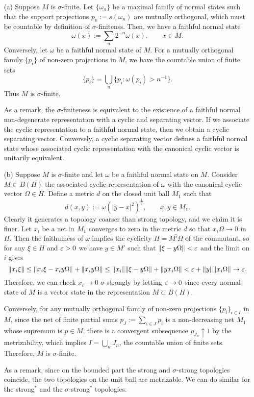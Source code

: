 \documentclass{../../large}
\begin{document}
\begin{pf}
(a)
Suppose $M$ is $\sigma$-finite.
Let $\{\omega_n\}$ be a maximal family of normal states such that the support projections $p_n:=s(\omega_n)$ are mutually orthogonal, which must be countable by definition of $\sigma$-finitenss.
Then, we have a faithful normal state
\[\omega(x):=\sum_n2^{-n}\omega(x),\qquad x\in M.\]
Conversely, let $\omega$ be a faithful normal state of $M$.
For a mutually orthogonal family $\{p_i\}$ of non-zero projections in $M$, we have the countable union of finite sets
\[\{p_i\}=\bigcup_n\{p_i:\omega(p_i)>n^{-1}\}.\]
Thus $M$ is $\sigma$-finite.

As a remark, the $\sigma$-finiteness is equivalent to the existence of a faithful normal non-degenerate representation with a cyclic and separating vector.
If we associate the cyclic representation to a faithful normal state, then we obtain a cyclic separating vector.
Conversely, a cyclic separating vector defines a faithful normal state whose associated cyclic representation with the canonical cyclic vector is unitarily equivalent.

(b)
Suppose $M$ is $\sigma$-finite and let $\omega$ be a faithful normal state on $M$.
Consider $M\subset B(H)$ the associated cyclic representation of $\omega$ with the canonical cyclic vector $\Omega\in H$.
Define a metric $d$ on the closed unit ball $M_1$ such that
\[d(x,y):=\omega(|y-x|^2)^{\frac12},\qquad x,y\in M_1.\]
Clearly it generates a topology coarser than strong topology, and we claim it is finer.
Let $x_i$ be a net in $M_1$ converges to zero in the metric $d$ so that $x_i\Omega\to0$ in $H$.
Then the faithulness of $\omega$ implies the cyclicity $H=\bar{M'\Omega}$ of the commutant, so for any $\xi\in H$ and $\varepsilon>0$ we have $y\in M'$ such that $\|\xi-y\Omega\|<\varepsilon$ and the limit on $i$ gives
\[\|x_i\xi\|\le\|x_i\xi-x_iy\Omega\|+\|x_iy\Omega\|\le\|x_i\|\|\xi-y\Omega\|+\|yx_i\Omega\|<\varepsilon+\|y\|\|x_i\Omega\|\to\varepsilon.\]
Therefore, we can check $x_i\to0$ $\sigma$-strongly by letting $\varepsilon\to0$ since every normal state of $M$ is a vector state in the representation $M\subset B(H)$.

Conversely, for any mutually orthogonal family of non-zero projections $\{p_i\}_{i\in I}$ in $M$, since the net of finite partial sums $p_J:=\sum_{i\in J}p_i$ is a non-decreasing net $M_1$ whose supremum is $p\in M$, there is a convergent subsequence $p_{J_n}\uparrow1$ by the metrizability, which implies $I=\bigcup_nJ_n$, the countable union of finite sets.
Therefore, $M$ is $\sigma$-finite.

As a remark, since on the bounded part the strong and $\sigma$-strong topologies coincide, the two topologies on the unit ball are metrizable.
We can do similar for the strong$^*$ and the $\sigma$-strong$^*$ topologies.
\end{pf}
\end{document}
